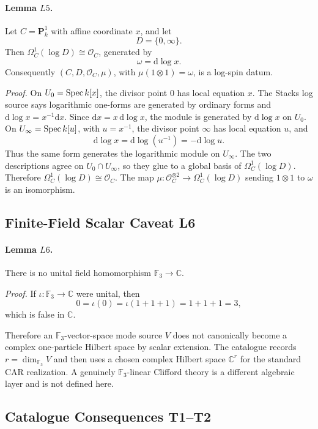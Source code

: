 \paragraph{Lemma \(L5\).}
Let \(C=\mathbf P^1_k\) with affine coordinate \(x\), and let
\[
  D=\{0,\infty\}.
\]
Then \(\Omega^1_C(\log D)\cong\mathcal O_C\), generated by
\[
  \omega=\mathrm d\log x .
\]
Consequently \((C,D,\mathcal O_C,\mu)\), with
\(\mu(1\otimes1)=\omega\), is a log-spin datum.

\emph{Proof.}
On \(U_0=\operatorname{Spec} k[x]\), the divisor point \(0\) has local equation \(x\).
The Stacks log source says logarithmic one-forms are generated by ordinary
forms and \(\mathrm d\log x=x^{-1}\mathrm dx\).  Since
\(\mathrm dx=x\,\mathrm d\log x\), the module is generated by
\(\mathrm d\log x\) on \(U_0\).  On \(U_\infty=\operatorname{Spec} k[u]\), with \(u=x^{-1}\),
the divisor point \(\infty\) has local equation \(u\), and
\[
  \mathrm d\log x=\mathrm d\log(u^{-1})=-\mathrm d\log u .
\]
Thus the same form generates the logarithmic module on \(U_\infty\).  The two
descriptions agree on \(U_0\cap U_\infty\), so they glue to a global basis of
\(\Omega^1_C(\log D)\).  Therefore \(\Omega^1_C(\log D)\cong\mathcal O_C\).
The map \(\mu:\mathcal O_C^{\otimes2}\to\Omega^1_C(\log D)\) sending
\(1\otimes1\) to \(\omega\) is an isomorphism.

\subsection{Finite-Field Scalar Caveat L6}
\paragraph{Lemma \(L6\).}
There is no unital field homomorphism \(\mathbb F_3\to\mathbb C\).

\emph{Proof.}
If \(\iota:\mathbb F_3\to\mathbb C\) were unital, then
\[
  0=\iota(0)=\iota(1+1+1)=1+1+1=3,
\]
which is false in \(\mathbb C\).

Therefore an \(\mathbb F_3\)-vector-space mode source \(V\) does not
canonically become a complex one-particle Hilbert space by scalar extension.
The catalogue records \(r=\dim_{\mathbb F_3}V\) and then uses a chosen complex
Hilbert space \(\mathbb C^r\) for the standard CAR realization.  A genuinely
\(\mathbb F_3\)-linear Clifford theory is a different algebraic layer and is
not defined here.

\subsection{Catalogue Consequences T1--T2}
